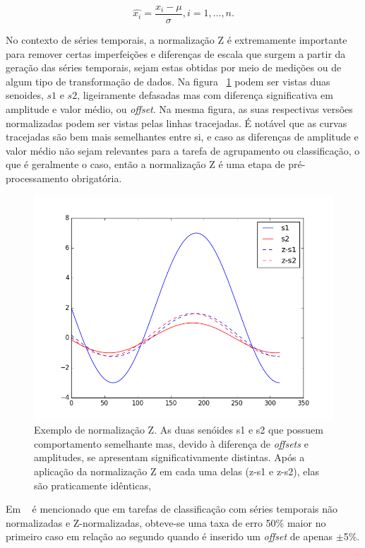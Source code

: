 \begin{equation}
\hat{x_i} = \frac{x_i - \mu}{\sigma}, i = 1,...,n.
\end{equation}

No contexto de séries temporais, a normalização Z é extremamente importante para remover certas imperfeições e diferenças de escala que surgem a partir da geração das séries temporais, sejam estas obtidas por meio de medições ou de algum tipo de transformação de dados. Na figura ~\ref{fig:z_norm} podem ser vistas duas senoides, $s1$ e $s2$, ligeiramente defasadas mas com diferença significativa em amplitude e valor médio, ou \emph{offset}. Na mesma figura, as suas respectivas versões normalizadas podem ser vistas pelas linhas tracejadas. É notável que as curvas tracejadas são bem mais semelhantes entre si, e caso as diferenças de amplitude e valor médio não sejam relevantes para a tarefa de agrupamento ou classificação, o que é geralmente o caso, então a normalização Z é uma etapa de pré-processamento obrigatória.
\begin{figure}[h!]
	\includegraphics[width=\linewidth]{figuras/z_norm.png}
	\caption{Exemplo de normalização Z. As duas senóides s1 e s2 que possuem comportamento semelhante mas, devido à diferença de \emph{offsets} e  amplitudes, se apresentam significativamente distintas. Após a aplicação da normalização Z em cada uma delas (z-s1 e z-s2), elas são praticamente idênticas, }
	\label{fig:z_norm}
\end{figure}
 Em ~\parencite{trillions} é mencionado que em tarefas de classificação com séries temporais não normalizadas e Z-normalizadas, obteve-se uma taxa de erro 50\% maior no primeiro caso em relação ao segundo quando é inserido um \emph{offset} de apenas $\pm$5\%.
 
